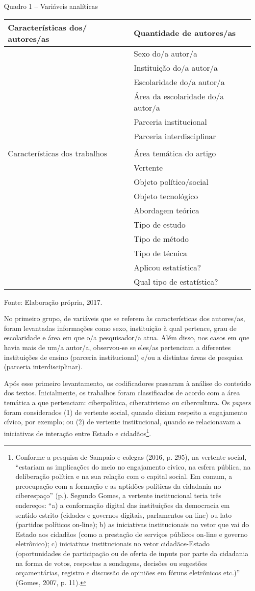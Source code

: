 Quadro 1 -- Variáveis analíticas

\begin{longtable}[]{@{}ll@{}}
\toprule
Características dos/ autores/as & Quantidade de
autores/as\tabularnewline
\midrule
\endhead
& Sexo do/a autor/a\tabularnewline
& Instituição do/a autor/a\tabularnewline
& Escolaridade do/a autor/a\tabularnewline
& Área da escolaridade do/a autor/a\tabularnewline
& Parceria institucional\tabularnewline
& Parceria interdisciplinar\tabularnewline
\tabularnewline
Características dos trabalhos & Área temática do artigo\tabularnewline
& Vertente\tabularnewline
& Objeto político/social\tabularnewline
& Objeto tecnológico\tabularnewline
& Abordagem teórica\tabularnewline
& Tipo de estudo\tabularnewline
& Tipo de método\tabularnewline
& Tipo de técnica\tabularnewline
& Aplicou estatística?\tabularnewline
& Qual tipo de estatística?\tabularnewline
\bottomrule
\end{longtable}

Fonte: Elaboração própria, 2017.

No primeiro grupo, de variáveis que se referem às características dos
autores/as, foram levantadas informações como sexo, instituição à qual
pertence, grau de escolaridade e área em que o/a pesquisador/a atua.
Além disso, nos casos em que havia mais de um/a autor/a, observou-se se
eles/as pertenciam a diferentes instituições de ensino (parceria
institucional) e/ou a distintas áreas de pesquisa (parceria
interdisciplinar).

Após esse primeiro levantamento, os codificadores passaram à análise do
conteúdo dos textos. Inicialmente, os trabalhos foram classificados de
acordo com a área temática a que pertenciam: ciberpolítica,
ciberativismo ou cibercultura. Os \emph{papers} foram considerados (1)
de vertente social, quando diziam respeito a engajamento cívico, por
exemplo; ou (2) de vertente institucional, quando se relacionavam a
iniciativas de interação entre Estado e cidadãos\footnote{Conforme a
  pesquisa de Sampaio e colegas (2016, p. 295), na vertente social,
  ``estariam as implicações do meio no engajamento cívico, na esfera
  pública, na deliberação política e na sua relação com o capital
  social. Em comum, a preocupação com a formação e as aptidões políticas
  da cidadania no ciberespaço'' (p.). Segundo Gomes, a vertente
  institucional teria três endereços: ``a) a conformação digital das
  instituições da democracia em sentido estrito (cidades e governos
  digitais, parlamentos on-line) ou lato (partidos políticos on-line);
  b) as iniciativas institucionais no vetor que vai do Estado aos
  cidadãos (como a prestação de serviços públicos on-line e governo
  eletrônico); c) iniciativas institucionais no vetor cidadãos-Estado
  (oportunidades de participação ou de oferta de inputs por parte da
  cidadania na forma de votos, respostas a sondagens, decisões ou
  sugestões orçamentárias, registro e discussão de opiniões em fóruns
  eletrônicos etc.)'' (Gomes, 2007, p. 11).}.

